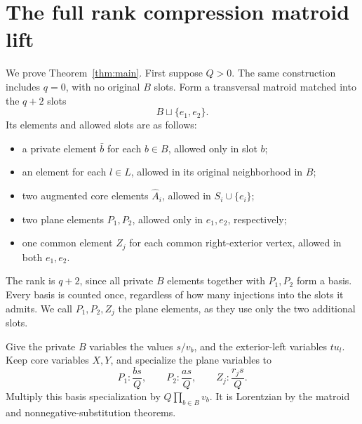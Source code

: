 \section{The full rank compression matroid lift}\label{sec:fulllift}
We prove Theorem~\ref{thm:main}. First suppose $Q>0$. The same construction includes $q=0$, with no original $B$ slots. Form a transversal matroid matched into the $q+2$ slots
\[
 B\sqcup\{e_1,e_2\}.
\]
Its elements and allowed slots are as follows:
\begin{itemize}
\item a private element $\bar b$ for each $b\in B$, allowed only in slot $b$;
\item an element for each $l\in L$, allowed in its original neighborhood in $B$;
\item two augmented core elements $\widehat A_i$, allowed in $S_i\cup\{e_i\}$;
\item two plane elements $P_1,P_2$, allowed only in $e_1,e_2$, respectively;
\item one common element $Z_j$ for each common right-exterior vertex, allowed in both $e_1,e_2$.
\end{itemize}
The rank is $q+2$, since all private $B$ elements together with $P_1,P_2$ form a basis. Every basis is counted once, regardless of how many injections into the slots it admits. We call $P_1,P_2,Z_j$ the plane elements, as they use only the two additional slots.

Give the private $B$ variables the values $s/v_b$, and the exterior-left variables $tu_l$. Keep core variables $X,Y$, and specialize the plane variables to
\begin{equation}\label{eq:planeweights}
 P_1:\frac{bs}{Q},\qquad P_2:\frac{as}{Q},\qquad
 Z_j:\frac{r_js}{Q}.
\end{equation}
Multiply this basis specialization by $Q\prod_{b\in B}v_b$. It is Lorentzian by the matroid and nonnegative-substitution theorems.

